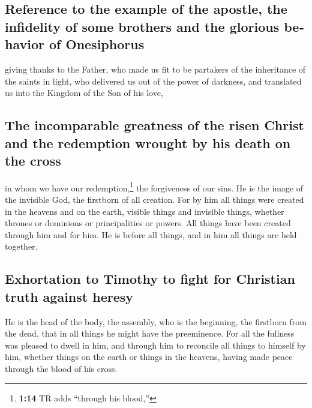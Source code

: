 \begin{paracol}{2}
\begin{otherlanguage}{english}
\hypertarget{reference-to-the-example-of-the-apostle-the-infidelity-of-some-brothers-and-the-glorious-behavior-of-onesiphorus}{%
\subsection{Reference to the example of the apostle, the infidelity of
some brothers and the glorious behavior of
Onesiphorus}\label{reference-to-the-example-of-the-apostle-the-infidelity-of-some-brothers-and-the-glorious-behavior-of-onesiphorus}}

 giving thanks to the Father, who made us fit to be
partakers of the inheritance of the saints in light,  who
delivered us out of the power of darkness, and translated us into the
Kingdom of the Son of his love,

\hypertarget{the-incomparable-greatness-of-the-risen-christ-and-the-redemption-wrought-by-his-death-on-the-cross}{%
\subsection{The incomparable greatness of the risen Christ and the
redemption wrought by his death on the
cross}\label{the-incomparable-greatness-of-the-risen-christ-and-the-redemption-wrought-by-his-death-on-the-cross}}

 in whom we have our redemption,\footnote{\textbf{1:14}
  TR adds ``through his blood,''} the forgiveness of our sins.
 He is the image of the invisible God, the firstborn of
all creation.  For by him all things were created in the
heavens and on the earth, visible things and invisible things, whether
thrones or dominions or principalities or powers. All things have been
created through him and for him.  He is before all
things, and in him all things are held together.

\hypertarget{exhortation-to-timothy-to-fight-for-christian-truth-against-heresy}{%
\subsection{Exhortation to Timothy to fight for Christian truth against
heresy}\label{exhortation-to-timothy-to-fight-for-christian-truth-against-heresy}}

 He is the head of the body, the assembly, who is the
beginning, the firstborn from the dead, that in all things he might have
the preeminence.  For all the fullness was pleased to
dwell in him,  and through him to reconcile all things to
himself by him, whether things on the earth or things in the heavens,
having made peace through the blood of his cross.


\end{otherlanguage}
\end{paracol}
